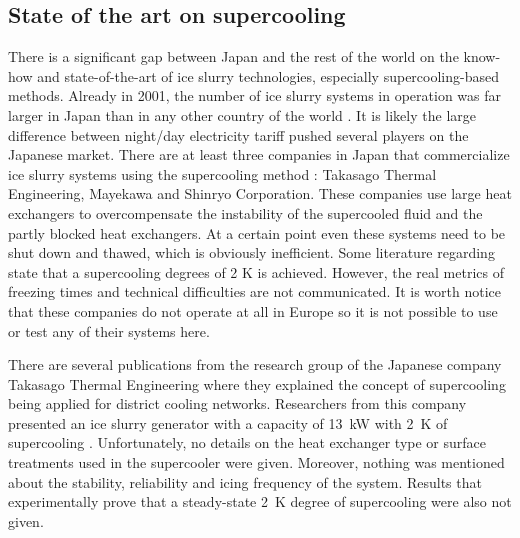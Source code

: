 



\subsection{State of the art on supercooling}
\label{section_lit_review_supercooling}

There is a significant gap between Japan and the rest of the world on the know-how and state-of-the-art of ice slurry technologies, especially supercooling-based methods. Already in 2001, the number of ice slurry systems in operation was far larger in Japan than in any other country of the world \citep{kauffeld_ice_2019}. It is likely the large difference between night/day electricity tariff pushed several players on the Japanese market. 
There are at least three companies in Japan that commercialize ice slurry systems using the supercooling method : Takasago Thermal Engineering, Mayekawa  and Shinryo Corporation. These companies use large heat exchangers to overcompensate the instability of the supercooled fluid and the partly blocked heat exchangers. At a certain point even these systems need to be shut down and thawed, which is obviously inefficient. Some literature regarding state that a supercooling degrees of 2 K is achieved.
However, the real metrics of freezing times and technical difficulties are not communicated. It is worth notice that these companies do not operate at all in Europe so it is not possible to use or test any of their systems here.
 
There are several publications from the research group of the Japanese company Takasago Thermal Engineering where they explained the concept of supercooling being applied for district cooling networks.
Researchers from this company presented an ice slurry generator with a capacity of 13~kW with 2~K of supercooling  \citep{tanino_ice-water_2001,kozawa_study_2005}. Unfortunately, no details on the heat exchanger type or surface treatments used in the supercooler were given. Moreover, nothing was mentioned about the stability, reliability and icing frequency of the system. Results that experimentally prove that a steady-state 2~K degree of supercooling were also not given. 


